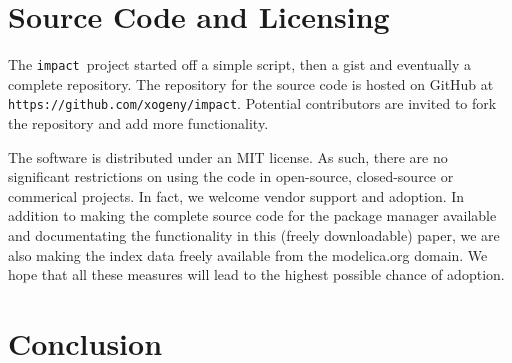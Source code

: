 \documentclass[11pt,a4paper,twocolumn]{article}
\newcommand{\impact}{\texttt{impact}} %
\newcommand{\code}[1]{\texttt{#1}} %
\begin{document}


\section{Source Code and Licensing}

The \impact\ project started off a simple script, then a gist and eventually a complete repository.  The repository for the source code is hosted on GitHub at
\code{https://github.com/xogeny/impact}.  Potential contributors are invited to fork the repository and add more functionality.

The software is distributed under an MIT license.  As such, there are no significant
restrictions on using the code in open-source, closed-source or commerical projects.
In fact, we welcome vendor support and adoption.  In addition to making the complete source code for the package manager available and documentating the functionality in this (freely downloadable) paper, we are also making the index data freely available from the modelica.org domain.   We hope that all these measures will lead to the highest possible chance of adoption.

\section{Conclusion}
\label{sec:conclusion}







\end{document}
